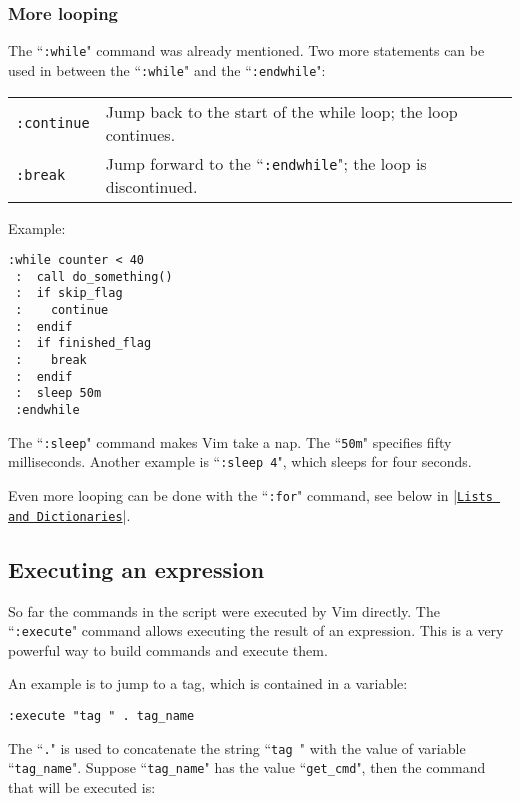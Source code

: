 \subsubsection{More looping}
The ``\texttt{:while}" command was already mentioned.
Two more statements can be used in between the ``\texttt{:while}" and the ``\texttt{:endwhile}":

\begin{center} \begin{tabular}{l l}
				\texttt{:continue} & Jump back to the start of the while loop; the loop continues. \\
				\texttt{:break} & Jump forward to the ``\texttt{:endwhile}"; the loop is discontinued. \\
\end{tabular} \end{center}

Example:

\begin{Verbatim}[samepage=true]
 :while counter < 40
 :  call do_something()
 :  if skip_flag
 :    continue
 :  endif
 :  if finished_flag
 :    break
 :  endif
 :  sleep 50m
 :endwhile
\end{Verbatim}

The ``\texttt{:sleep}" command makes Vim take a nap.
The ``\texttt{50m}" specifies fifty milliseconds.
Another example is ``\texttt{:sleep 4}", which sleeps for four seconds.

Even more looping can be done with the ``\texttt{:for}" command, see below in |\hyperref[Lists and Dictionaries]{\texttt{Lists and Dictionaries}}|.
\subsection{Executing an expression}
So far the commands in the script were executed by Vim directly.
The ``\texttt{:execute}" command allows executing the result of an expression.
This is a very powerful way to build commands and execute them.

An example is to jump to a tag, which is contained in a variable:

\begin{Verbatim}[samepage=true]
 :execute "tag " . tag_name
\end{Verbatim}

The ``\texttt{.}" is used to concatenate the string ``\texttt{tag }" with the value of variable ``\texttt{tag\_name}".
Suppose ``\texttt{tag\_name}" has the value ``\texttt{get\_cmd}", then the command that will be executed is:

